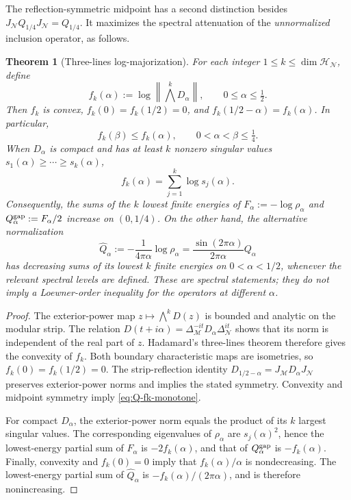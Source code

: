 \documentclass[a4paper,11pt]{article}
\newtheorem{theorem}{Theorem}
\theoremstyle{definition}
\newcommand{\mN}{\mathcal{N}}
\newcommand{\mH}{\mathcal{H}}
\newcommand{\mM}{\mathcal{M}}
\begin{document}
The reflection-symmetric midpoint has a second distinction besides
$J_\mN Q_{1/4}J_\mN=Q_{1/4}$. It maximizes the spectral
attenuation of the \emph{unnormalized} inclusion operator, as follows.

\begin{theorem}[Three-lines log-majorization]
\label{thm:Q-three-lines}
For each integer $1\leq k\leq\dim\mH_{\mN}$, define
\begin{equation}
 f_k(\alpha)
 :=\log\left\|\bigwedge^kD_\alpha\right\|,
 \qquad 0\leq\alpha\leq\tfrac12.
 \label{eq:Q-fk-definition}
\end{equation}
Then $f_k$ is convex, $f_k(0)=f_k(1/2)=0$, and
$f_k(1/2-\alpha)=f_k(\alpha)$. In particular,
\begin{equation}
 \boxed{f_k(\beta)\leq f_k(\alpha),
 \qquad 0<\alpha<\beta\leq\tfrac14.}
 \label{eq:Q-fk-monotone}
\end{equation}
When $D_\alpha$ is compact and has at least $k$ nonzero singular
values $s_1(\alpha)\geq\cdots\geq s_k(\alpha)$,
\begin{equation}
 f_k(\alpha)=\sum_{j=1}^k\log s_j(\alpha).
\end{equation}
Consequently, the sums of the $k$ lowest finite energies of
$F_\alpha:=-\log\rho_\alpha$ and
$Q_\alpha^{\rm gap}:=F_\alpha/2$ increase on $(0,1/4)$.
On the other hand, the alternative normalization
\begin{equation}
 \widehat Q_\alpha:=-\frac{1}{4\pi\alpha}\log\rho_\alpha
 =\frac{\sin(2\pi\alpha)}{2\pi\alpha}Q_\alpha
 \label{eq:Q-alpha-linear-normalization}
\end{equation}
has \emph{decreasing} sums of its lowest $k$ finite energies on
$0<\alpha<1/2$, whenever the relevant spectral levels are defined.
These are spectral statements; they do not imply a Loewner-order
inequality for the operators at different $\alpha$.
\end{theorem}

\begin{proof}
The exterior-power map $z\mapsto\bigwedge^k D(z)$ is bounded
and analytic on the modular strip. The relation
$D(t+i\alpha)=\Delta_\mM^{-it}D_\alpha\Delta_\mN^{it}$
shows that its norm is independent of the real part of $z$.
Hadamard's three-lines theorem \cite{BerghLofstrom1976}
therefore gives the convexity of $f_k$.
Both boundary characteristic maps are isometries, so $f_k(0)=
f_k(1/2)=0$. The strip-reflection identity
$D_{1/2-\alpha}=J_\mM D_\alpha J_\mN$
preserves exterior-power norms and implies the stated symmetry.
Convexity and midpoint symmetry imply \eqref{eq:Q-fk-monotone}.

For compact $D_\alpha$, the exterior-power norm equals the
product of its $k$ largest singular values. The corresponding
eigenvalues of $\rho_\alpha$ are $s_j(\alpha)^2$, hence the
lowest-energy partial sum of $F_\alpha$ is $-2f_k(\alpha)$,
and that of $Q_\alpha^{\rm gap}$ is $-f_k(\alpha)$.
Finally, convexity and $f_k(0)=0$ imply that
$f_k(\alpha)/\alpha$ is nondecreasing. The lowest-energy
partial sum of $\widehat Q_\alpha$ is
$-f_k(\alpha)/(2\pi\alpha)$, and is therefore nonincreasing.
\end{proof}
\end{document}
